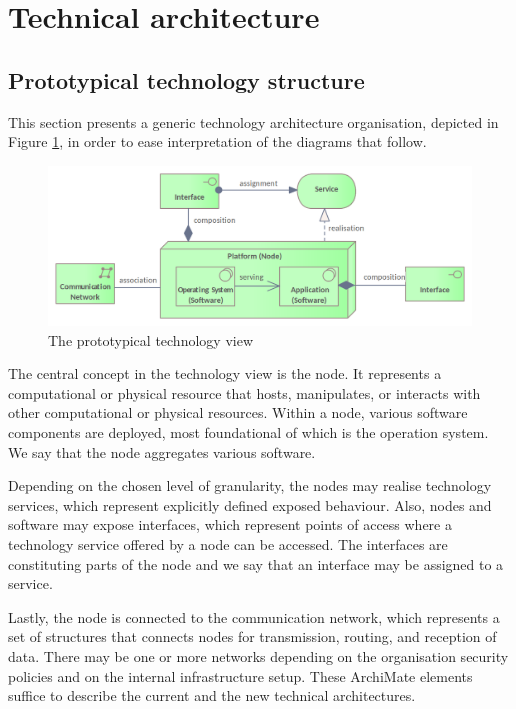 \section{Technical architecture}
\label{sec:technical-architecture}

	\subsection{Prototypical technology structure}
	
	This section presents a generic technology architecture organisation, depicted in Figure \ref{fig:technology-view}, in order to ease interpretation of the diagrams that follow.
	
	\begin{figure}[!h]
		\centering
		\includegraphics[width=.75\textwidth]{images/views/Technology View.png}
		\caption{The prototypical technology view}
		\label{fig:technology-view}
	\end{figure}

	The central concept in the technology view is the node. It represents a computational or physical resource that hosts, manipulates, or interacts with other computational or physical resources. Within a node, various software components are deployed, most foundational of which is the operation system. We say that the node aggregates various software. 
	
	Depending on the chosen level of granularity, the nodes may realise technology services, which represent explicitly defined exposed behaviour. Also, nodes and software may expose interfaces, which represent points of access where a technology service offered by a node can be accessed. The interfaces are constituting parts of the node and we say that an interface may be assigned to a service.
	
	Lastly, the node is connected to the communication network, which represents a set of structures that connects nodes for transmission, routing, and reception of data. There may be one or more networks depending on the organisation security policies and on the internal infrastructure setup. These ArchiMate elements suffice to describe the current and the new technical architectures. 	
	

